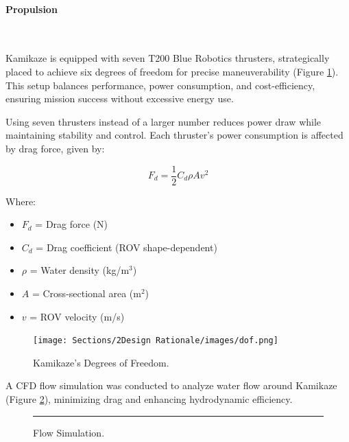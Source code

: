 \vspace{-0.3cm}
\paragraph{Propulsion} \ \\
\vspace{-0.5cm}

Kamikaze is equipped with seven T200 Blue Robotics thrusters, strategically placed to achieve six degrees of freedom for precise maneuverability (Figure \ref{fig:dof}). This setup balances performance, power consumption, and cost-efficiency, ensuring mission success without excessive energy use.

\hspace{10pt} Using seven thrusters instead of a larger number reduces power draw while maintaining stability and control. Each thruster's power consumption is affected by drag force, given by:

\begin{equation}
    F_d = \frac{1}{2} C_d \rho A v^2
    \label{eq:drag_force}
\end{equation}

Where:

\vspace{-0.5\baselineskip}
\begin{itemize}
    \setlength{\itemsep}{0pt}
    \item \(F_d\) = Drag force (N)
    \item \(C_d\) = Drag coefficient (ROV shape-dependent)
    \item \(\rho\) = Water density (kg/m\(^3\))
    \item \(A\) = Cross-sectional area (m\(^2\))
    \item \(v\) = ROV velocity (m/s)
\end{itemize}

\begin{figure}[h]
    \centering
    \texttt{[image: Sections/2Design Rationale/images/dof.png]}
    \caption{Kamikaze’s Degrees of Freedom.}
    \label{fig:dof}
\end{figure}

A CFD flow simulation was conducted to analyze water flow around Kamikaze (Figure \ref{fig:cfd}), minimizing drag and enhancing hydrodynamic efficiency.

\begin{figure}[h]
    \centering
    \rule{0.8\columnwidth}{4cm}
    \caption{Flow Simulation.}
    \label{fig:cfd}
\end{figure}

